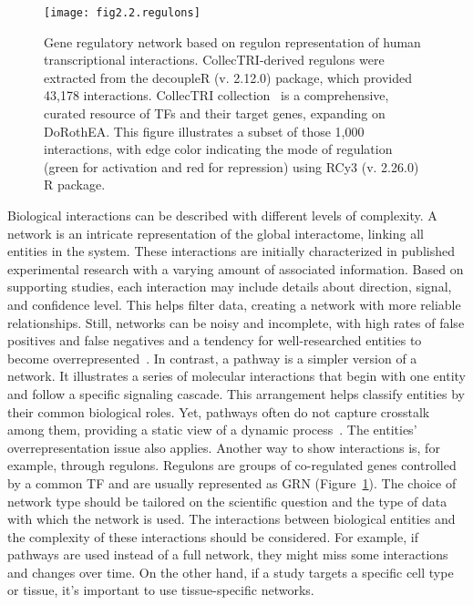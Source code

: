 \begin{figure}[htbp]
    \centering
    \texttt{[image: fig2.2.regulons]}
    \caption[Gene regulatory network based on regulon representation of human transcriptional interactions.]{Gene regulatory network based on regulon representation of human transcriptional interactions. CollecTRI-derived regulons were extracted from the decoupleR (v. 2.12.0) package, which provided 43,178 interactions. CollecTRI collection~\cite{RN145} is a comprehensive, curated resource of \gls{TF}s and their target genes, expanding on DoRothEA. This figure illustrates a subset of those 1,000 interactions, with edge color indicating the mode of regulation (green for activation and red for repression) using RCy3 (v. 2.26.0) R package.}
    \label{fig:fig2.2.regulons}
\end{figure}


Biological interactions can be described with different levels of complexity. A network is an intricate representation of the global interactome, linking all entities in the system. These interactions are initially characterized in published experimental research with a varying amount of associated information. Based on supporting studies, each interaction may include details about direction, signal, and confidence level. This helps filter data, creating a network with more reliable relationships. 
Still, networks can be noisy and incomplete, with high rates of false positives and false negatives and a tendency for well-researched entities to become overrepresented~\cite{RN131, RN38, RN136}. In contrast, a pathway is a simpler version of a network. It illustrates a series of molecular interactions that begin with one entity and follow a specific signaling cascade. This arrangement helps classify entities by their common biological roles. 
Yet, pathways often do not capture crosstalk among them, providing a static view of a dynamic process~\cite{RN38}. The entities' overrepresentation issue also applies. Another way to show interactions is, for example, through regulons. 
Regulons are groups of co-regulated genes controlled by a common \gls{TF} and are usually represented as \gls{GRN} (Figure~\ref{fig:fig2.2.regulons}). The choice of network type should be tailored on the scientific question and the type of data with which the network is used. The interactions between biological entities and the complexity of these interactions should be considered. For example, if pathways are used instead of a full network, they might miss some interactions and changes over time. On the other hand, if a study targets a specific cell type or tissue, it's important to use tissue-specific networks.

